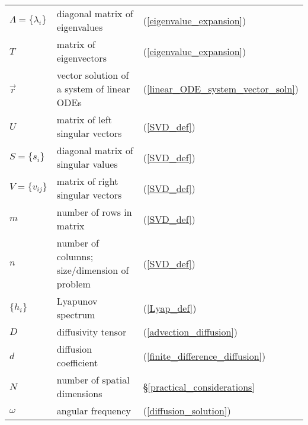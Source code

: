 \begin{tabular}{lll}
	$\Lambda = \lbrace \lambda_i \rbrace$ & diagonal matrix of eigenvalues & (\ref{eigenvalue_expansion}) \\
	$T$ & matrix of eigenvectors & (\ref{eigenvalue_expansion}) \\
	$\vec r$ & vector solution of a system of linear ODEs & (\ref{linear_ODE_system_vector_soln}) \\
	$U$ & matrix of left singular vectors & (\ref{SVD_def}) \\
	$S=\lbrace s_i \rbrace$ & diagonal matrix of singular values & (\ref{SVD_def}) \\
	$V=\lbrace v_{ij} \rbrace$ & matrix of right singular vectors & (\ref{SVD_def}) \\
	$m$ & number of rows in matrix & (\ref{SVD_def}) \\
	$n$ & number of columns; size/dimension of problem & (\ref{SVD_def}) \\
	$\lbrace h_i \rbrace$ & Lyapunov spectrum & (\ref{Lyap_def}) \\
	$D$ & diffusivity tensor & (\ref{advection_diffusion}) \\
	$d$ & diffusion coefficient & (\ref{finite_difference_diffusion}) \\
	$N$ & number of spatial dimensions & \S \ref{practical_considerations} \\
	$\omega$ & angular frequency & (\ref{diffusion_solution})
\end{tabular}

